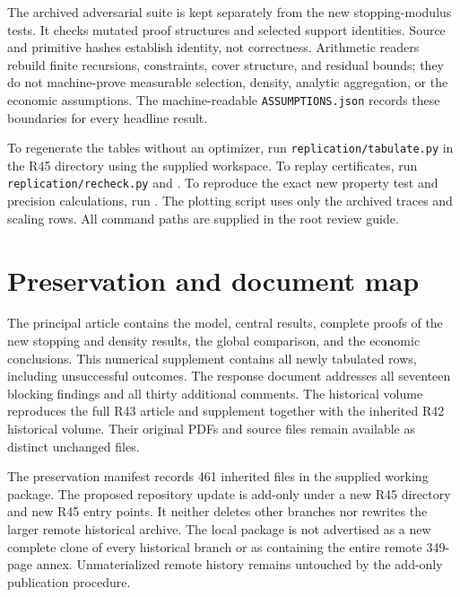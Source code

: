 The archived adversarial suite is kept separately from the new stopping-modulus tests. It checks mutated proof structures and selected support identities. Source and primitive hashes establish identity, not correctness. Arithmetic readers rebuild finite recursions, constraints, cover structure, and residual bounds; they do not machine-prove measurable selection, density, analytic aggregation, or the economic assumptions. The machine-readable \texttt{ASSUMPTIONS.json} records these boundaries for every headline result.

To regenerate the tables without an optimizer, run \texttt{replication/tabulate.py} in the R45 directory using the supplied workspace. To replay certificates, run \texttt{replication/recheck.py} and . To reproduce the exact new property test and precision calculations, run . The plotting script uses only the archived traces and scaling rows. All command paths are supplied in the root review guide.

\section{Preservation and document map}
The principal article contains the model, central results, complete proofs of the new stopping and density results, the global comparison, and the economic conclusions. This numerical supplement contains all newly tabulated rows, including unsuccessful outcomes. The response document addresses all seventeen blocking findings and all thirty additional comments. The historical volume reproduces the full R43 article and supplement together with the inherited R42 historical volume. Their original PDFs and source files remain available as distinct unchanged files.

The preservation manifest records 461 inherited files in the supplied working package. The proposed repository update is add-only under a new R45 directory and new R45 entry points. It neither deletes other branches nor rewrites the larger remote historical archive. The local package is not advertised as a new complete clone of every historical branch or as containing the entire remote 349-page annex. Unmaterialized remote history remains untouched by the add-only publication procedure.

